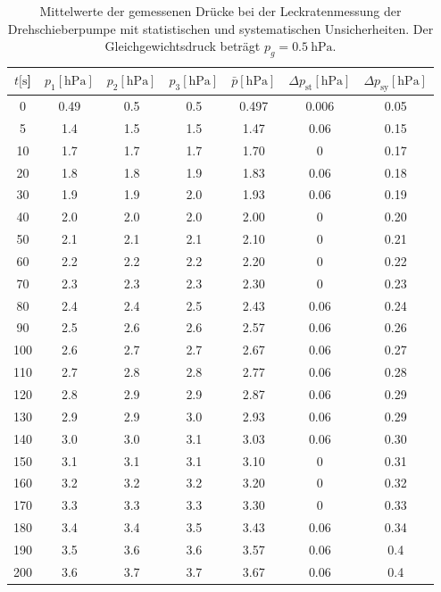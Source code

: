 \noindent
\begin{table}[H]
  \centering
    \caption{Mittelwerte der gemessenen Drücke bei der Leckratenmessung der Drehschieberpumpe mit statistischen und systematischen Unsicherheiten. Der Gleichgewichtsdruck beträgt $p_g=\SI{0.5}{\hecto\pascal}$.}
    \label{tab:Dreh_Leck1}
    \begin{tabular}{
      S[table-format=3.0] 
      S[table-format=1.2] S[table-format=1.1] S[table-format=1.1]
      S[table-format=1.3] S[table-format=1.3] S[table-format=1.2]
      }
      \toprule
      {$t [\si{\second}$]} &
      {$p_1 [\si{\hecto\pascal}]$} & {$p_2 [\si{\hecto\pascal}]$} & {$p_3 [\si{\hecto\pascal}]$} &
      {$\bar{p} [\si{\hecto\pascal}]$} & {$\Delta p_\text{st} [\si{\hecto\pascal}]$} & {$\Delta p_\text{sy} [\si{\hecto\pascal}]$}\\
         & 0.49& 0.5 & 0.5 & 0.497 & 0.006 & 0.05 \\
      5   & 1.4 & 1.5 & 1.5 & 1.47  & 0.06  & 0.15 \\
      10  & 1.7 & 1.7 & 1.7 & 1.70  & 0     & 0.17 \\
      20  & 1.8 & 1.8 & 1.9 & 1.83  & 0.06  & 0.18 \\
      30  & 1.9 & 1.9 & 2.0 & 1.93  & 0.06  & 0.19 \\
      40  & 2.0 & 2.0 & 2.0 & 2.00  & 0     & 0.20 \\
      50  & 2.1 & 2.1 & 2.1 & 2.10  & 0     & 0.21 \\
      60  & 2.2 & 2.2 & 2.2 & 2.20  & 0     & 0.22 \\
      70  & 2.3 & 2.3 & 2.3 & 2.30  & 0     & 0.23 \\
      80  & 2.4 & 2.4 & 2.5 & 2.43  & 0.06  & 0.24 \\
      90  & 2.5 & 2.6 & 2.6 & 2.57  & 0.06  & 0.26 \\
      100 & 2.6 & 2.7 & 2.7 & 2.67  & 0.06  & 0.27 \\
      110 & 2.7 & 2.8 & 2.8 & 2.77  & 0.06  & 0.28 \\
      120 & 2.8 & 2.9 & 2.9 & 2.87  & 0.06  & 0.29 \\
      130 & 2.9 & 2.9 & 3.0 & 2.93  & 0.06  & 0.29 \\
      140 & 3.0 & 3.0 & 3.1 & 3.03  & 0.06  & 0.30 \\
      150 & 3.1 & 3.1 & 3.1 & 3.10  & 0     & 0.31 \\
      160 & 3.2 & 3.2 & 3.2 & 3.20  & 0     & 0.32 \\
      170 & 3.3 & 3.3 & 3.3 & 3.30  & 0     & 0.33 \\
      180 & 3.4 & 3.4 & 3.5 & 3.43  & 0.06  & 0.34 \\
      190 & 3.5 & 3.6 & 3.6 & 3.57  & 0.06  & 0.4  \\
      200 & 3.6 & 3.7 & 3.7 & 3.67  & 0.06  & 0.4  \\
      \bottomrule
    \end{tabular}
\end{table}
